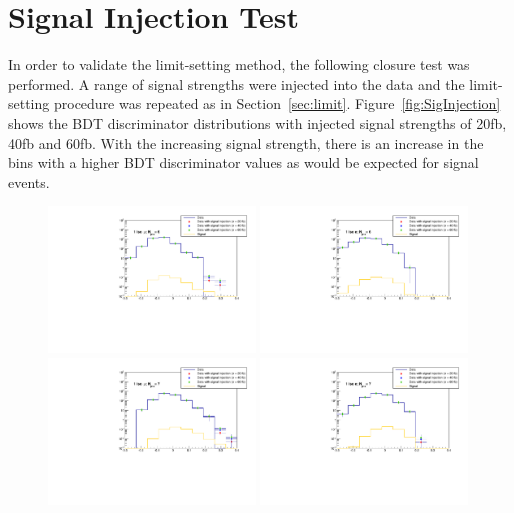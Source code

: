 {\section{Signal Injection Test}
\label{sec:signalinjection}
In order to validate the limit-setting method, the following closure test was performed. A range of signal strengths were injected into the data and the limit-setting procedure was repeated as in Section~\ref{sec:limit}. Figure~\ref{fig:SigInjection} shows the BDT discriminator distributions with injected signal strengths of 20fb, 40fb and 60fb. With the increasing signal strength, there is an increase in the bins with a higher BDT discriminator values as would be expected for signal events.
\begin{figure}[ht!]
\centering
    \includegraphics[width=0.49\textwidth]{images/Run1/SignalInjection_Mu_6j.pdf}
     \includegraphics[width=0.49\textwidth]{images/Run1/SignalInjection_El_6j.pdf}
    \includegraphics[width=0.49\textwidth]{images/Run1/SignalInjection_Mu_7j.pdf}
     \includegraphics[width=0.49\textwidth]{images/Run1/SignalInjection_El_7j.pdf}

\end{figure}}
